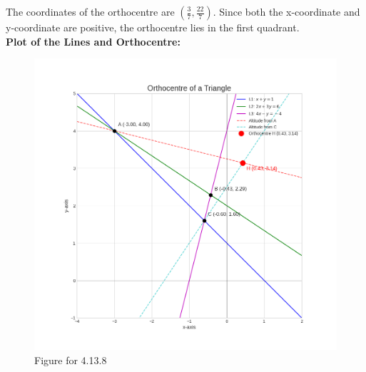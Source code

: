 \documentclass[journal]{IEEEtran}
\begin{document}
The coordinates of the orthocentre are $(\frac{3}{7}, \frac{22}{7})$.
Since both the x-coordinate and y-coordinate are positive, the orthocentre lies in the first quadrant.\\

\textbf{Plot of the Lines and Orthocentre:}
\begin{figure}[H]
    \centering
    \includegraphics[width=0.9\columnwidth]{figs/fig1.png}
    \caption{Figure for 4.13.8}
    \label{}
\end{figure}
\end{document}
